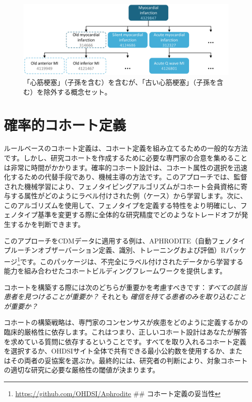 \documentclass[
  11pt]{book}
\theoremstyle{definition}
\theoremstyle{definition}
\theoremstyle{definition}
\theoremstyle{definition}
\theoremstyle{remark}
\begin{document}
\begin{figure}

{\centering \includegraphics[width=1\linewidth]{images/Cohorts/conceptSet} 

}

\caption{「心筋梗塞」（子孫を含む）を含むが、「古い心筋梗塞」（子孫を含む）を除外する概念セット。}\label{fig:conceptSet}
\end{figure}

\section{確率的コホート定義}\label{ux78baux7387ux7684ux30b3ux30dbux30fcux30c8ux5b9aux7fa9}

ルールベースのコホート定義は、コホート定義を組み立てるための一般的な方法です。しかし、研究コホートを作成するために必要な専門家の合意を集めることは非常に時間がかかります。確率的コホート設計は、コホート属性の選択を迅速化するための代替手段であり、機械主導の方法です。このアプローチでは、監督された機械学習により、フェノタイピングアルゴリズムがコホート会員資格に寄与する属性がどのようにラベル付けされた例（ケース）から学習します。次に、このアルゴリズムを使用して、フェノタイプを定義する特性をより明確にし、フェノタイプ基準を変更する際に全体的な研究精度でどのようなトレードオフが発生するかを判断できます。 

このアプローチをCDMデータに適用する例は、APHRODITE（自動フェノタイプルーチンオブザーバーション定義、識別、トレーニングおよび評価）Rパッケージ\footnote{\url{https://github.com/OHDSI/Aphrodite}
  \#\# コホート定義の妥当性}です。このパッケージは、不完全にラベル付けされたデータから学習する能力を組み合わせたコホートビルディングフレームワークを提供します。 \citep{Banda2017APHRODITE} 

コホートを構築する際には次のどちらが重要かを考慮すべきです：\emph{すべての該当患者を見つけることが重要か？} それとも \emph{確信を持てる患者のみを取り込むことが重要か？}

コホートの構築戦略は、専門家のコンセンサスが疾患をどのように定義するかの臨床的厳格性に依存します。これはつまり、正しいコホート設計はあなたが解答を求めている質問に依存するということです。すべてを取り入れるコホート定義を選択するか、OHDSIサイト全体で共有できる最小公約数を使用するか、またはその両者の妥協案を選ぶか。最終的には、研究者の判断により、対象コホートの適切な研究に必要な厳格性の閾値が決まります。
\end{document}
